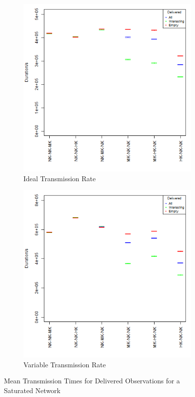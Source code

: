 \begin{figure}[H]
\centering
\begin{subfigure}{\textwidth}
  \centering
  \includegraphics[height=.5\textheight]{Chap7/figures/plots/saturated_ideal/delivered_mean.png}
  \caption{Ideal Transmission Rate}
	\label{fig:sim:res:sat:ideal:delmean}
\end{subfigure}%
\vfill
\begin{subfigure}{\textwidth}
  \centering
  \includegraphics[height=.5\textheight]{Chap7/figures/plots/saturated_variable/delivered_mean.png}
  \caption{Variable Transmission Rate}
	\label{fig:sim:res:sat:variable:delmean}
\end{subfigure}
\caption{Mean Transmission Times for Delivered Observations for a Saturated Network}
\end{figure}
	
